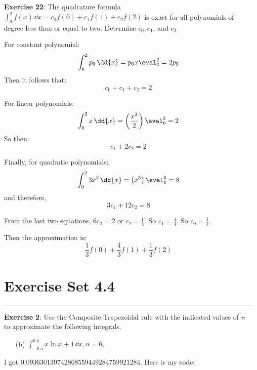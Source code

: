 \documentclass{article}
\begin{document}
\textbf{Exercise 22}: The quadrature formula $\int_{0}^{2} f(x) \, \dd{x} = c_{0}f(0) + c_{1}f(1) + c_{2}f(2)$ is exact for all polynomials of degree less than or equal to two. Determine $c_{0}, c_{1}$, and $c_{2}$
    \begin{answer}
        For constant polynomial:
            \begin{equation*}
                \int_{0}^{2} p_{0} \, \dd{x} = p_{0}x\eval_{0}^{2} = 2p_{0}
            \end{equation*}
        Then it follows that:
            \begin{equation*}
                c_{0} + c_{1} + c_{2} = 2
            \end{equation*}

        For linear polynomials:
            \begin{equation*}
                \int_{0}^{2} x \, \dd{x} = \left(\dfrac{x^{2}}{2}\right)\eval_{0}^{2} = 2
            \end{equation*}
        So then:
            \begin{equation*}
                c_{1} + 2c_{2} = 2
            \end{equation*}

        Finally, for quadratic polynomials:
            \begin{equation*}
                \int_{0}^{2} 3x^{2} \, \dd{x} = \left(x^{3}\right)\eval_{0}^{2} = 8
            \end{equation*}
        and therefore,
            \begin{equation*}
                3c_{1} + 12c_{2} = 8
            \end{equation*}

        From the last two equations, $6c_{2} = 2$ or $c_{2} = \frac{1}{3}$. So $c_{1} = \frac{4}{3}$. So $c_{0} = \frac{1}{3}$.

        Then the approximation is:
            \begin{equation*}
                \dfrac{1}{3}f(0) + \dfrac{4}{3}f(1) + \dfrac{1}{3}f(2)
            \end{equation*}
    \end{answer}

\newpage
\section*{Exercise Set 4.4}
\hrule

\textbf{Exercise 2}: Use the Composite Trapezoidal rule with the indicated values of $n$ to approximate the following integrals.
    \begin{itemize}
        \item [(b)] $\int_{-0.5}^{0.5} x\ln{x + 1} \, \dd{x}, n = 6$.
    \end{itemize}
    \begin{answer}
        I got $0.093630139742868559449284759921284$. Here is my code:
        \inputminted{matlab}{./code/CompositeIntegration/CompositeTrapezoidal.m}
        \inputminted{matlab}{./code/script3.m}
    \end{answer}
\end{document}
